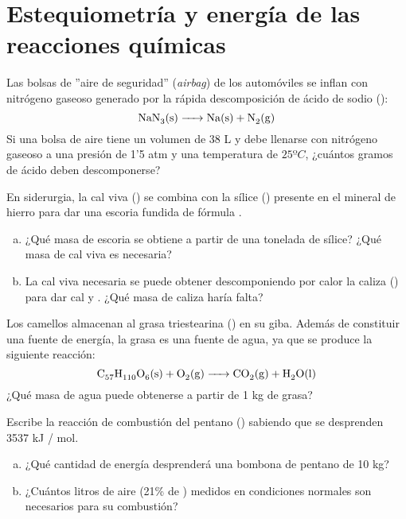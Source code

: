 \section{Estequiometría y energía de las reacciones químicas}

\begin{prob}
Las bolsas de ''aire de seguridad'' (\textit{airbag}) de los automóviles se inflan con
nitrógeno gaseoso generado por la rápida descomposición de ácido de sodio ():
$$ \ce{NaN3 (s) -> Na (s) + N2 (g)} $$
Si una bolsa de aire tiene un volumen de 38 L y debe llenarse con nitrógeno gaseoso a una
presión de 1'5 atm y una temperatura de $25ºC$, ¿cuántos gramos de ácido deben descomponerse?
\end{prob}

\begin{prob}
En siderurgia, la cal viva () se combina con la sílice () presente en
el mineral de hierro para dar una escoria fundida de fórmula .
\begin{enumerate}[a)]
	\item ¿Qué masa de escoria se obtiene a partir de una tonelada de sílice? ¿Qué masa 
	de cal viva es necesaria?
	\item La cal viva necesaria se puede obtener descomponiendo por calor la caliza 
	() para dar cal y . ¿Qué masa de caliza haría falta?
\end{enumerate}
\end{prob}

\begin{prob}
Los camellos almacenan al grasa triestearina () en su giba. Además de
constituir una fuente de energía, la grasa es una fuente de agua, ya que se produce la
siguiente reacción:
$$ \ce{C57H110O6 (s) + O2 (g) -> CO2 (g) + H2O (l)} $$
¿Qué masa de agua puede obtenerse a partir de 1 kg de grasa?
\end{prob}

\begin{prob}
Escribe la reacción de combustión del pentano () sabiendo que se desprenden
3537 kJ / mol.
\begin{enumerate}[a)]
	\item ¿Qué cantidad de energía desprenderá una bombona de pentano de 10 kg?
	\item ¿Cuántos litros de aire (21\% de ) medidos en condiciones normales son 
	necesarios para su combustión?
\end{enumerate}
\end{prob}

